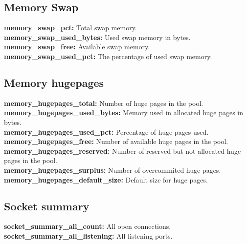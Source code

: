 \documentclass{iosart2c}
\begin{document}
\subsection{Memory Swap}

\textbf{memory\_swap\_pct:} Total swap memory.\\

\textbf{memory\_swap\_used\_bytes:} Used swap memory in bytes.\\

\textbf{memory\_swap\_free:} Available swap memory.\\

\textbf{memory\_swap\_used\_pct:} The percentage of used swap memory.\\


\subsection{Memory hugepages}

\textbf{memory\_hugepages\_total:} Number of huge pages in the pool.\\

\textbf{memory\_hugepages\_used\_bytes:} Memory used in allocated huge pages in bytes.\\

\textbf{memory\_hugepages\_used\_pct:} Percentage of huge pages used.\\

\textbf{memory\_hugepages\_free:} Number of available huge pages in the pool.\\

\textbf{memory\_hugepages\_reserved:} Number of reserved but not allocated huge pages in the pool.\\

\textbf{memory\_hugepages\_surplus:} Number of overcommited huge pages.\\

\textbf{memory\_hugepages\_default\_size:} Default size for huge pages.




\subsection{Socket summary}

\textbf{socket\_summary\_all\_count:} All open connections.\\

\textbf{socket\_summary\_all\_listening:} All listening ports.\\
\end{document}
